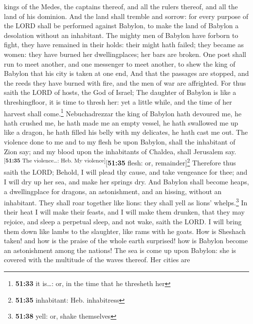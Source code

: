 kings of the Medes, the captains thereof, and all the rulers thereof,
and all the land of his dominion.  And the land shall
tremble and sorrow: for every purpose of the LORD shall be performed
against Babylon, to make the land of Babylon a desolation without an
inhabitant.  The mighty men of Babylon have forborn to
fight, they have remained in their holds: their might hath failed; they
became as women: they have burned her dwellingplaces; her bars are
broken.  One post shall run to meet another, and one
messenger to meet another, to shew the king of Babylon that his city is
taken at one end,  And that the passages are stopped, and
the reeds they have burned with fire, and the men of war are affrighted.
 For thus saith the LORD of hosts, the God of Israel; The
daughter of Babylon is like a threshingfloor, it is time to thresh her:
yet a little while, and the time of her harvest shall come.\footnote{\textbf{51:33}
  it is\ldots: or, in the time that he thresheth her} 
Nebuchadrezzar the king of Babylon hath devoured me, he hath crushed me,
he hath made me an empty vessel, he hath swallowed me up like a dragon,
he hath filled his belly with my delicates, he hath cast me out.
 The violence done to me and to my flesh be upon Babylon,
shall the inhabitant of Zion say; and my blood upon the inhabitants of
Chaldea, shall Jerusalem say.\textsuperscript{{[}\textbf{51:35} The
violence\ldots: Heb. My violence{]}}{[}\textbf{51:35} flesh: or,
remainder{]}\footnote{\textbf{51:35} inhabitant: Heb. inhabitress}
 Therefore thus saith the LORD; Behold, I will plead thy
cause, and take vengeance for thee; and I will dry up her sea, and make
her springs dry.  And Babylon shall become heaps, a
dwellingplace for dragons, an astonishment, and an hissing, without an
inhabitant.  They shall roar together like lions: they
shall yell as lions' whelps.\footnote{\textbf{51:38} yell: or, shake
  themselves}  In their heat I will make their feasts,
and I will make them drunken, that they may rejoice, and sleep a
perpetual sleep, and not wake, saith the LORD.  I will
bring them down like lambs to the slaughter, like rams with he goats.
 How is Sheshach taken! and how is the praise of the
whole earth surprised! how is Babylon become an astonishment among the
nations!  The sea is come up upon Babylon: she is covered
with the multitude of the waves thereof.  Her cities are
